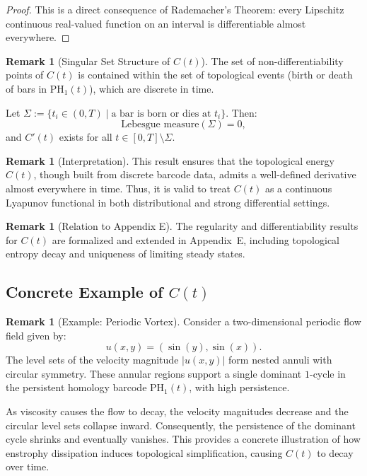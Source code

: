 \documentclass[11pt]{article}
\theoremstyle{definition}
\newtheorem{remark}[theorem]{Remark}
\begin{document}
\begin{proof}
This is a direct consequence of Rademacher's Theorem: every Lipschitz continuous real-valued function on an interval is differentiable almost everywhere.
\end{proof}

\begin{remark}[Singular Set Structure of $C(t)$]
The set of non-differentiability points of $C(t)$ is contained within the set of topological events (birth or death of bars in $\mathrm{PH}_1(t)$), which are discrete in time.

Let $\Sigma := \{ t_i \in (0,T) \mid \text{a bar is born or dies at } t_i \}$. Then:
\[
\text{Lebesgue measure}(\Sigma) = 0,
\]
and $C'(t)$ exists for all $t \in [0,T] \setminus \Sigma$.
\end{remark}

\begin{remark}[Interpretation]
This result ensures that the topological energy $C(t)$, though built from discrete barcode data, admits a well-defined derivative almost everywhere in time. Thus, it is valid to treat $C(t)$ as a continuous Lyapunov functional in both distributional and strong differential settings.
\end{remark}

\begin{remark}[Relation to Appendix E]
The regularity and differentiability results for $C(t)$ are formalized and extended in Appendix~E, including topological entropy decay and uniqueness of limiting steady states.
\end{remark}

\subsection{Concrete Example of $C(t)$}

\begin{remark}[Example: Periodic Vortex]
Consider a two-dimensional periodic flow field given by:
\[
    u(x, y) = (\sin(y), \sin(x)).
\]
The level sets of the velocity magnitude $|u(x, y)|$ form nested annuli with circular symmetry. These annular regions support a single dominant $1$-cycle in the persistent homology barcode $\mathrm{PH}_1(t)$, with high persistence.

As viscosity causes the flow to decay, the velocity magnitudes decrease and the circular level sets collapse inward. Consequently, the persistence of the dominant cycle shrinks and eventually vanishes. This provides a concrete illustration of how enstrophy dissipation induces topological simplification, causing $C(t)$ to decay over time.
\end{remark}
\end{document}
